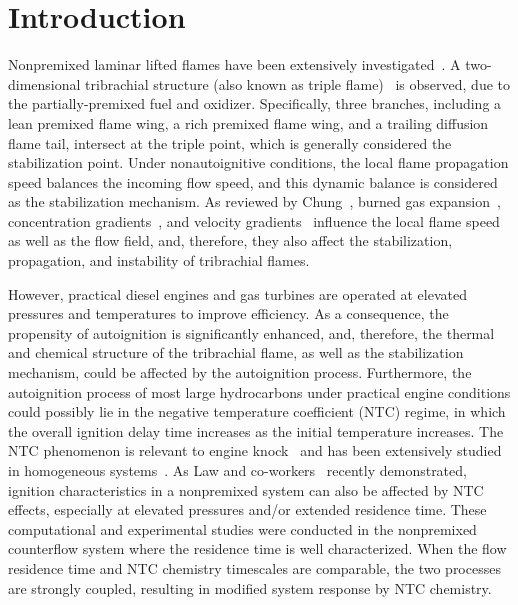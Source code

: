 \documentclass{wssci}
\begin{document}

\section{Introduction}

Nonpremixed laminar lifted flames have been extensively investigated~\cite{chung07}. A two-dimensional tribrachial structure (also known as triple flame)~\cite{buckmaster02} is observed, due to the partially-premixed fuel and oxidizer.  Specifically, three branches, including a lean premixed flame wing, a rich premixed flame wing, and a trailing diffusion flame tail, intersect at the triple point, which is generally considered the stabilization point.  Under nonautoignitive conditions, the local flame propagation speed balances the incoming flow speed, and this dynamic balance is considered as the stabilization mechanism.  As reviewed by Chung~\cite{chung07}, burned gas expansion~\cite{ruetsch95,lee97,plessing98,kioni99}, concentration gradients~\cite{dold89,hartley91,ghosal00}, and velocity gradients~\cite{kim07} influence the local flame speed as well as the flow field, and, therefore, they also affect the stabilization, propagation, and instability of tribrachial flames.

However, practical diesel engines and gas turbines are operated at elevated pressures and temperatures to improve efficiency.  As a consequence, the propensity of autoignition is significantly enhanced, and, therefore, the thermal and chemical structure of the tribrachial flame, as well as the stabilization mechanism, could be affected by the autoignition process.  Furthermore, the autoignition process of most large hydrocarbons under practical engine conditions could possibly lie in the negative temperature coefficient (NTC) regime, in which the overall ignition delay time increases as the initial temperature increases.  The NTC phenomenon is relevant to engine knock~\cite{battin-leclerc08} and has been extensively studied in homogeneous systems~\cite{zador11}.  As Law and co-workers~\cite{law12,zhao13,deng14} recently demonstrated, ignition characteristics in a nonpremixed system can also be affected by NTC effects, especially at elevated pressures and/or extended residence time.  These computational and experimental studies were conducted in the nonpremixed counterflow system where the residence time is well characterized.  When the flow residence time and NTC chemistry timescales are comparable, the two processes are strongly coupled, resulting in modified system response by NTC chemistry.
\end{document}
